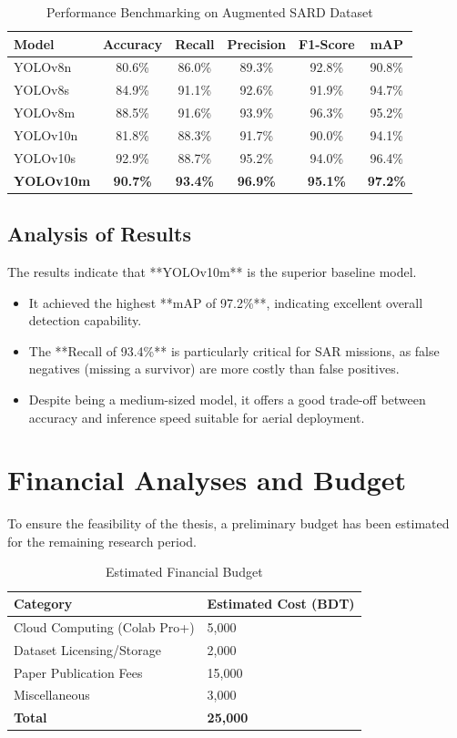 \documentclass[12pt, a4paper]{report}
\begin{document}
\begin{table}[H]
    \centering
    \caption{Performance Benchmarking on Augmented SARD Dataset}
    \label{tab:yolo_results}
    \begin{tabular}{|l|c|c|c|c|c|}
    \hline
    \textbf{Model} & \textbf{Accuracy} & \textbf{Recall} & \textbf{Precision} & \textbf{F1-Score} & \textbf{mAP} \\ \hline
    YOLOv8n & 80.6\% & 86.0\% & 89.3\% & 92.8\% & 90.8\% \\ \hline
    YOLOv8s & 84.9\% & 91.1\% & 92.6\% & 91.9\% & 94.7\% \\ \hline
    YOLOv8m & 88.5\% & 91.6\% & 93.9\% & 96.3\% & 95.2\% \\ \hline
    YOLOv10n & 81.8\% & 88.3\% & 91.7\% & 90.0\% & 94.1\% \\ \hline
    YOLOv10s & 92.9\% & 88.7\% & 95.2\% & 94.0\% & 96.4\% \\ \hline
    \textbf{YOLOv10m} & \textbf{90.7\%} & \textbf{93.4\%} & \textbf{96.9\%} & \textbf{95.1\%} & \textbf{97.2\%} \\ \hline
    \end{tabular}
\end{table}

\subsection{Analysis of Results}
The results indicate that **YOLOv10m** is the superior baseline model.
\begin{itemize}
    \item It achieved the highest **mAP of 97.2\%**, indicating excellent overall detection capability.
    \item The **Recall of 93.4\%** is particularly critical for SAR missions, as false negatives (missing a survivor) are more costly than false positives.
    \item Despite being a medium-sized model, it offers a good trade-off between accuracy and inference speed suitable for aerial deployment.
\end{itemize}

\section{Financial Analyses and Budget}
To ensure the feasibility of the thesis, a preliminary budget has been estimated for the remaining research period.
\begin{table}[H]
    \centering
    \caption{Estimated Financial Budget}
    \begin{tabular}{|l|l|}
    \hline
    \textbf{Category} & \textbf{Estimated Cost (BDT)} \\ \hline
    Cloud Computing (Colab Pro+) & 5,000 \\ \hline
    Dataset Licensing/Storage & 2,000 \\ \hline
    Paper Publication Fees & 15,000 \\ \hline
    Miscellaneous & 3,000 \\ \hline
    \textbf{Total} & \textbf{25,000} \\ \hline
    \end{tabular}
\end{table}
\end{document}
